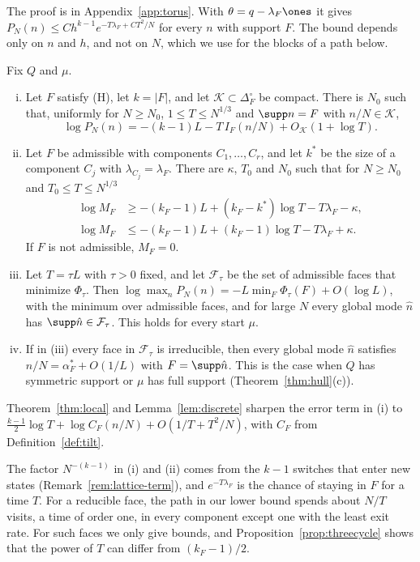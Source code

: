 The proof is in Appendix~\ref{app:torus}. With $\theta=q-\lambda_F\ones$ it
gives $P_N(n)\le Ch^{k-1}e^{-T\lambda_F+CT^2/N}$ for every $n$ with support
$F$. The bound depends only on $n$ and $h$, and not on $N$, which we use for
the blocks of a path below.

\begin{theorem}\label{thm:first}
Fix $Q$ and $\mu$.
\begin{enumerate}[(i)]
\item Let $F$ satisfy (H), let $k=\lvert F\rvert$, and let
$\mathcal K\subset\Delta_F^\circ$ be compact. There is $N_0$ such that,
uniformly for $N\ge N_0$, $1\le T\le N^{1/3}$ and $\supp n=F$ with
$n/N\in\mathcal K$,
\[
 \log P_N(n)=-(k-1)L-T\,I_F(n/N)+O_{\mathcal K}(1+\log T).
\]
\item Let $F$ be admissible with components $C_1,\dots,C_r$, and let $k^*$ be
the size of a component $C_j$ with $\lambda_{C_j}=\lambda_F$. There are
$\kappa$, $T_0$ and $N_0$ such that for $N\ge N_0$ and $T_0\le T\le N^{1/3}$
\begin{align*}
 \log M_F&\ge-(k_F-1)L+(k_F-k^*)\log T-T\lambda_F-\kappa,\\
 \log M_F&\le-(k_F-1)L+(k_F-1)\log T-T\lambda_F+\kappa.
\end{align*}
If $F$ is not admissible, $M_F=0$.
\item Let $T=\tau L$ with $\tau>0$ fixed, and let $\mathcal F_\tau$ be the set
of admissible faces that minimize $\Phi_\tau$. Then
$\log\max_nP_N(n)=-L\min_F\Phi_\tau(F)+O(\log L)$, with the minimum over
admissible faces, and for large $N$ every global mode $\hat n$ has
$\supp\hat n\in\mathcal F_\tau$. This holds for every start $\mu$.
\item If in (iii) every face in $\mathcal F_\tau$ is irreducible, then every
global mode $\hat n$ satisfies $\hat n/N=\alpha^*_F+O(1/L)$ with
$F=\supp\hat n$. This is the case when $Q$ has symmetric support or $\mu$ has
full support (Theorem~\ref{thm:hull}(c)).
\end{enumerate}
\end{theorem}

Theorem~\ref{thm:local} and Lemma~\ref{lem:discrete} sharpen the error term
in (i) to $\frac{k-1}2\log T+\log C_F(n/N)+O(1/T+T^2/N)$, with $C_F$ from
Definition~\ref{def:tilt}.

\begin{remark}\label{rem:cost}
The factor $N^{-(k-1)}$ in (i) and (ii) comes from the $k-1$ switches that
enter new states (Remark~\ref{rem:lattice-term}), and $e^{-T\lambda_F}$ is
the chance of staying in $F$ for a time $T$. For a reducible face, the path in
our lower bound spends about $N/T$ visits, a time of order one, in every
component except one with the least exit rate. For such faces we only give bounds, and Proposition~\ref{prop:threecycle}
shows that the power of $T$ can differ from $(k_F-1)/2$.
\end{remark}

